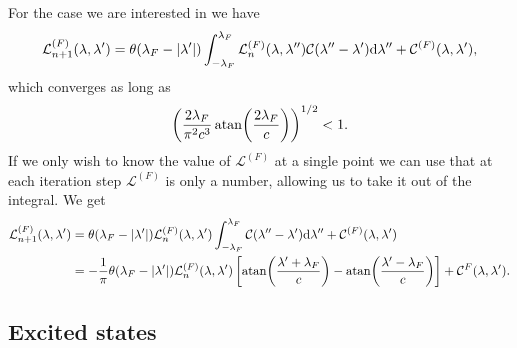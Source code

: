 \documentclass[11pt, a4paper]{report} %
\newcommand{\inversetruncc}{\mathcal{L}}
\newcommand{\kernel}{\mathcal{C}}
\begin{document}
For the case we are interested in we have 
\begin{equation}
  \inversetruncc^{(F)}_{n+1} (\lambda, \lambda') = \theta(\lambda_F - \abs{\lambda'}) \int_{-\lambda_F}^{\lambda_F} \inversetruncc^{(F)}_n(\lambda, \lambda'') \kernel (\lambda''-\lambda') \dd \lambda'' + \kernel^{(F)}(\lambda, \lambda'),
\end{equation}
which converges as long as 
\begin{equation}
\left(\frac{2\lambda_F}{\pi^2c^3} \atan(\frac{2\lambda_F}{c})\right)^{1/2} < 1.
\end{equation}
If we only wish to know the value of $\inversetruncc^{(F)}$ at a single point we can
use that at each iteration step $\inversetruncc^{(F)}$ is only a number, allowing us to take it out of the integral. 
We get
\begin{align}
  \inversetruncc^{(F)}_{n+1} (\lambda, \lambda') &= \theta(\lambda_F - \abs{\lambda'})  \inversetruncc^{(F)}_n(\lambda, \lambda') \int_{-\lambda_F}^{\lambda_F} \kernel (\lambda''-\lambda') \dd \lambda'' + \kernel^{(F)}(\lambda, \lambda')\\
&= - \frac{1}{\pi} \theta(\lambda_F - \abs{\lambda'}) \inversetruncc^{(F)}_n(\lambda, \lambda') \left[ \atan(\frac{\lambda'+\lambda_F}{c}) - \atan(\frac{\lambda'-\lambda_F}{c})\right] + \kernel^{F}(\lambda,\lambda').
\end{align}

\subsection{Excited states}
\end{document}
